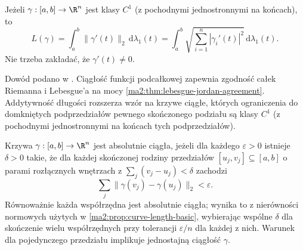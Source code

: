 \begin{twierdzenie}
\label{ma2:thm:curve-c1-length}
Jeżeli $\gamma:[a,b]\to\R^n$ jest klasy $C^1$
(z pochodnymi jednostronnymi na końcach), to
\[
 L(\gamma)=\int_a^b\|\gamma'(t)\|_2\,\mathrm d\lambda_1(t)
 =\int_a^b\sqrt{\sum_{i=1}^n|\gamma_i'(t)|^2}\,
 \mathrm d\lambda_1(t).
\]
Nie trzeba zakładać, że $\gamma'(t)\ne0$.
\end{twierdzenie}
Dowód podano w
.
Ciągłość funkcji podcałkowej zapewnia zgodność
całek Riemanna i Lebesgue'a na mocy
\ref{ma2:thm:lebesgue-jordan-agreement}.
Addytywność długości rozszerza wzór na krzywe
ciągłe, których ograniczenia do domkniętych
podprzedziałów pewnego skończonego podziału
są klasy $C^1$ (z pochodnymi jednostronnymi
na końcach tych podprzedziałów).

\begin{definicja}
\label{ma2:def:curve-ac}
Krzywa $\gamma:[a,b]\to\R^n$ jest absolutnie
ciągła, jeżeli dla każdego
$\varepsilon>0$ istnieje $\delta>0$ takie, że
dla każdej skończonej rodziny przedziałów
$[u_j,v_j]\subseteq[a,b]$ o parami rozłącznych
wnętrzach z $\sum_j(v_j-u_j)<\delta$ zachodzi
\[
 \sum_j\|\gamma(v_j)-\gamma(u_j)\|_2<\varepsilon.
\]
Równoważnie każda współrzędna jest absolutnie
ciągła; wynika to z nierówności normowych użytych
w \ref{ma2:prop:curve-length-basic}, wybierając
wspólne $\delta$ dla skończenie wielu współrzędnych
przy tolerancji $\varepsilon/n$ dla każdej z nich.
Warunek dla pojedynczego przedziału implikuje
jednostajną ciągłość $\gamma$.
\end{definicja}

